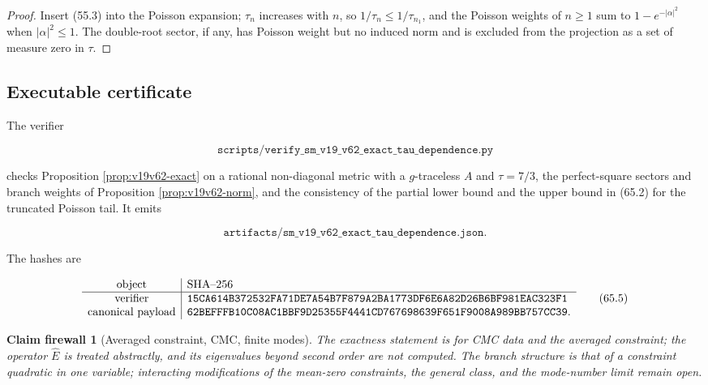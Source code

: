 \documentclass[11pt]{article}
\newtheorem{firewall}[theorem]{Claim firewall}
\theoremstyle{remark}
\begin{document}
\begin{proof}
Insert (55.3) into the Poisson expansion; \(\tau_n\) increases with
\(n\), so \(1/\tau_n\leq1/\tau_{n_1}\), and the Poisson weights of
\(n\geq1\) sum to \(1-e^{-|\alpha|^2}\) when \(|\alpha|^2\leq1\).  The
double-root sector, if any, has Poisson weight but no induced norm and
is excluded from the projection as a set of measure zero in
\(\tau\).
\end{proof}

\subsection{Executable certificate}

The verifier

\[
 \texttt{scripts/verify\_sm\_v19\_v62\_exact\_tau\_dependence.py}    \tag{65.3}
\]

checks Proposition \ref{prop:v19v62-exact} on a rational non-diagonal
metric with a \(g\)-traceless \(A\) and \(\tau=7/3\), the perfect-square
sectors and branch weights of Proposition \ref{prop:v19v62-norm}, and
the consistency of the partial lower bound and the upper bound in
(65.2) for the truncated Poisson tail.  It emits

\[
 \texttt{artifacts/sm\_v19\_v62\_exact\_tau\_dependence.json}.       \tag{65.4}
\]

The hashes are

\[
\begin{array}{c|l}
\hbox{object}&\hbox{SHA--256}\\ \hline
\hbox{verifier}&
\texttt{15CA614B372532FA71DE7A54B7F879A2BA1773DF6E6A82D26B6BF981EAC323F1}\\
\hbox{canonical payload}&
\texttt{62BEFFFB10C08AC1BBF9D25355F4441CD767698639F651F9008A989BB757CC39}.
\end{array}                                                     \tag{65.5}
\]

\begin{firewall}[Averaged constraint, CMC, finite modes]
\label{fire:v19v62}
The exactness statement is for CMC data and the averaged constraint;
the operator \(\widehat E\) is treated abstractly, and its eigenvalues
beyond second order are not computed.  The branch structure is that
of a constraint quadratic in one variable; interacting modifications
of the mean-zero constraints, the general class, and the mode-number
limit remain open.
\end{firewall}
\end{document}

